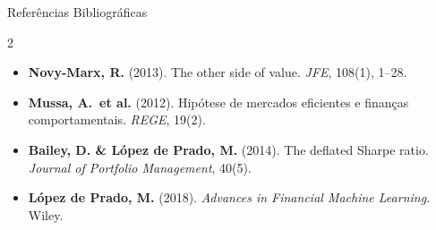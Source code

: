 \documentclass[aspectratio=169,12pt]{beamer}
\begin{document}
\begin{frame}[fragile]{Referências Bibliográficas}
\begin{multicols}{2}
\begin{itemize}
  \item \textbf{Novy-Marx, R.} (2013). The other side of value. \textit{JFE}, 108(1), 1--28.
  \item \textbf{Mussa, A.\ et al.} (2012). Hipótese de mercados eficientes e finanças comportamentais. \textit{REGE}, 19(2).
  \item \textbf{Bailey, D. \& López de Prado, M.} (2014). The deflated Sharpe ratio. \textit{Journal of Portfolio Management}, 40(5).
  \item \textbf{López de Prado, M.} (2018). \textit{Advances in Financial Machine Learning}. Wiley.
\end{itemize}
\end{multicols}
\end{frame}
\end{document}
